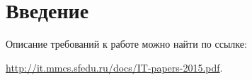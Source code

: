 
\section*{Введение}

Описание требований к работе можно найти по ссылке:

\begin{center}
\href{http://it.mmcs.sfedu.ru/docs/IT-papers-2015.pdf}{http://it.mmcs.sfedu.ru/docs/IT-papers-2015.pdf}.    
\end{center}



